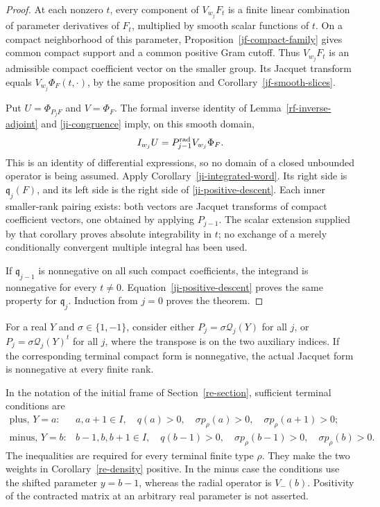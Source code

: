 \begin{proof}
At each nonzero \(t\), every component of \(V_{w_j}F_t\) is a
finite linear combination of parameter derivatives of \(F_t\),
multiplied by smooth scalar functions of \(t\).  On a compact
neighborhood of this parameter, Proposition~\ref{jf-compact-family}
gives common compact support and a common positive Gram cutoff.
Thus \(V_{w_j}F_t\) is an admissible compact coefficient vector
on the smaller group.  Its Jacquet transform equals
\(V_{w_j}\Phi_F(t,\cdot)\), by the same proposition and
Corollary~\ref{jf-smooth-slices}.

Put \(U=\Phi_{P_jF}\) and \(V=\Phi_F\).  The formal inverse
identity of Lemma~\ref{rf-inverse-adjoint} and
\eqref{ji-congruence} imply, on this smooth domain,
\[
 I_{w_j}U=P_{j-1}^{\rm rad}V_{w_j}\Phi_F.
\]
This is an identity of differential expressions, so no domain of a
closed unbounded operator is being assumed.  Apply
Corollary~\ref{ji-integrated-word}.  Its right side is
\(\mathfrak q_j(F)\), and its left side is the right side of
\eqref{ji-positive-descent}.  Each inner smaller-rank pairing
exists: both vectors are Jacquet transforms of compact coefficient
vectors, one obtained by applying \(P_{j-1}\).
The scalar extension supplied by that corollary proves absolute
integrability in \(t\); no exchange of a merely conditionally
convergent multiple integral has been used.

If \(\mathfrak q_{j-1}\) is nonnegative on all such compact
coefficients, the integrand is nonnegative for every \(t\ne0\).
Equation~\eqref{ji-positive-descent} proves the same property for
\(\mathfrak q_j\).  Induction from \(j=0\) proves the theorem.
\end{proof}

\begin{corollary}\label{ji-one-insertion}
For a real \(Y\) and \(\sigma\in\{1,-1\}\), consider either
\(P_j=\sigma\mathcal Q_j(Y)\) for all \(j\), or
\(P_j=\sigma\mathcal Q_j(Y)^t\) for all \(j\), where the
transpose is on the two auxiliary indices.  If the corresponding
terminal compact form is nonnegative, the actual Jacquet form is
nonnegative at every finite rank.

In the notation of the initial frame of
Section~\ref{re-section}, sufficient terminal conditions are
\[
\begin{array}{ll}
\text{plus, }Y=a:
 &a,a+1\in I,\quad q(a)>0,\quad
           \sigma p_\rho(a)>0,\quad\sigma p_\rho(a+1)>0;\\[2pt]
\text{minus, }Y=b:
 &b-1,b,b+1\in I,\quad q(b-1)>0,\quad
           \sigma p_\rho(b-1)>0,\quad\sigma p_\rho(b)>0.
\end{array}
\]
The inequalities are required for every terminal finite type
\(\rho\).  They make the two weights in
Corollary~\ref{re-density} positive.  In the minus case the
conditions use the shifted parameter \(y=b-1\), whereas the
radial operator is \(V_-(b)\).  Positivity of the contracted
matrix at an arbitrary real parameter is not asserted.
\end{corollary}


